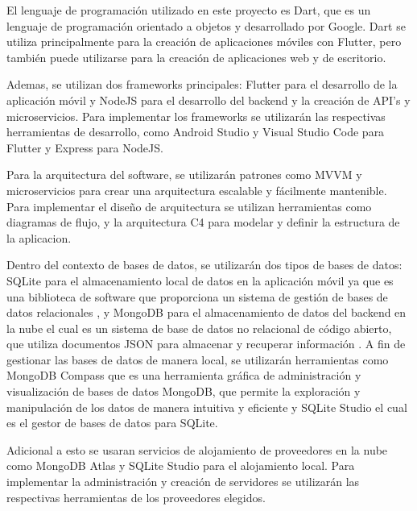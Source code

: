 \documentclass[runningheads]{llncs}
\begin{document}
            El lenguaje de programación utilizado en este proyecto es Dart, que es un lenguaje de programación orientado a objetos y desarrollado por Google. Dart se utiliza principalmente para la creación de aplicaciones móviles con Flutter, pero también puede utilizarse para la creación de aplicaciones web y de escritorio. 

            Ademas, se utilizan dos frameworks principales: Flutter para el desarrollo de la aplicación móvil y NodeJS para el desarrollo del backend y la creación de API's y microservicios. Para implementar los frameworks se utilizarán las respectivas herramientas de desarrollo, como Android Studio y Visual Studio Code para Flutter y Express para NodeJS. 

            Para la arquitectura del software, se utilizarán patrones como MVVM y microservicios para crear una arquitectura escalable y fácilmente mantenible. Para implementar el diseño de arquitectura se utilizan herramientas como diagramas de flujo, y la arquitectura C4 para modelar y definir la estructura de la aplicacion.

            Dentro del contexto de bases de datos, se utilizarán dos tipos de bases de datos: SQLite para el almacenamiento local de datos en la aplicación móvil ya que es una biblioteca de software que proporciona un sistema de gestión de bases de datos relacionales \cite{Cita17}, y MongoDB para el almacenamiento de datos del backend en la nube el cual es un sistema de base de datos no relacional de código abierto, que utiliza documentos JSON para almacenar y recuperar información \cite{Cita18}. A fin de gestionar las bases de datos de manera local, se utilizarán herramientas como MongoDB Compass que es una herramienta gráfica de administración y visualización de bases de datos MongoDB, que permite la exploración y manipulación de los datos de manera intuitiva y eficiente y SQLite Studio el cual es el gestor de bases de datos para SQLite.

            Adicional a esto se usaran servicios de alojamiento de proveedores en la nube como MongoDB Atlas y SQLite Studio para el alojamiento local. Para implementar la administración y creación de servidores se utilizarán las respectivas herramientas de los proveedores elegidos.

    
    
\end{document}

